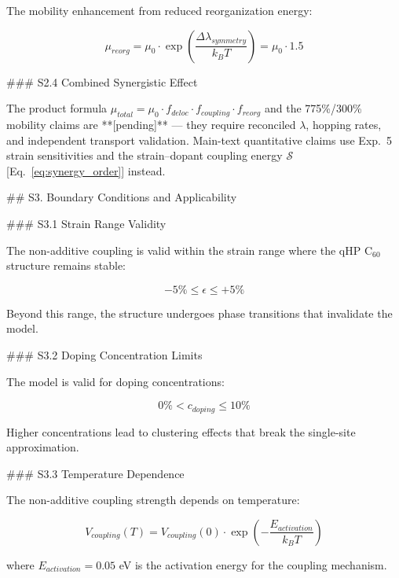 The mobility enhancement from reduced reorganization energy:

\begin{equation}
\mu_{reorg} = \mu_0 \cdot \exp\left(\frac{\Delta\lambda_{symmetry}}{k_B T}\right) = \mu_0 \cdot 1.5
\label{eq:S2_mobility_reorg}
\end{equation}

### S2.4 Combined Synergistic Effect

The product formula $\mu_{total} = \mu_0 \cdot f_{deloc} \cdot f_{coupling} \cdot f_{reorg}$ and the 775\%/300\% mobility claims are **[pending]** — they require reconciled $\lambda$, hopping rates, and independent transport validation. Main-text quantitative claims use Exp.~5 strain sensitivities and the strain--dopant coupling energy $\mathcal{S}$ [Eq.~\eqref{eq:synergy_order}] instead.

## S3. Boundary Conditions and Applicability

### S3.1 Strain Range Validity

The non-additive coupling is valid within the strain range where the qHP C$_{60}$ structure remains stable:

\begin{equation}
-5\% \leq \epsilon \leq +5\%
\label{eq:S3_strain_range}
\end{equation}

Beyond this range, the structure undergoes phase transitions that invalidate the model.

### S3.2 Doping Concentration Limits

The model is valid for doping concentrations:

\begin{equation}
0\% < c_{doping} \leq 10\%
\label{eq:S3_doping_range}
\end{equation}

Higher concentrations lead to clustering effects that break the single-site approximation.

### S3.3 Temperature Dependence

The non-additive coupling strength depends on temperature:

\begin{equation}
V_{coupling}(T) = V_{coupling}(0) \cdot \exp\left(-\frac{E_{activation}}{k_B T}\right)
\label{eq:S3_temp_dependence}
\end{equation}

where $E_{activation} = 0.05$ eV is the activation energy for the coupling mechanism.

